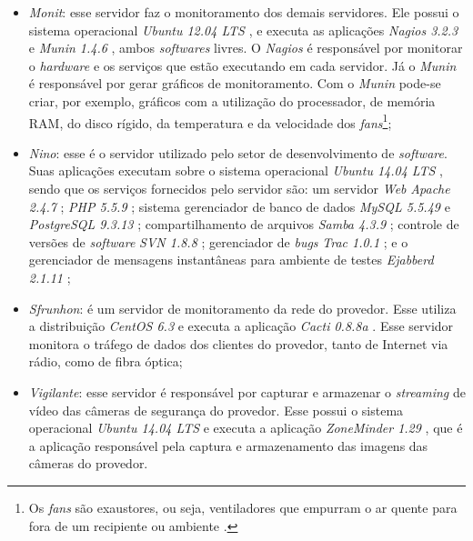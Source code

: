 \begin{itemize}
 \item \textit{Monit}: esse servidor faz o monitoramento dos demais servidores. Ele possui o sistema operacional \textit{Ubuntu 12.04 \ac{LTS}} 
 \cite{ubuntu}, e executa as aplicações \textit{Nagios 3.2.3} \cite{nagios} e \textit{Munin 1.4.6} \cite{munin}, ambos \textit{softwares} livres. 
 O \textit{Nagios} é responsável por monitorar o \textit{hardware} e os serviços que estão executando em cada servidor. Já o \textit{Munin} é 
 responsável por gerar gráficos de monitoramento. Com o \textit{Munin} pode-se criar, por exemplo, gráficos com a utilização do processador, 
 de memória \ac{RAM}, do disco rígido, da temperatura e da velocidade dos \textit{fans}\footnote[3]{Os \textit{fans} são exaustores, ou seja, 
 ventiladores que empurram o ar quente para fora de um recipiente ou ambiente \cite{ats2012}.};
 
 \item \textit{Nino}: esse é o servidor utilizado pelo setor de desenvolvimento de \textit{software}. Suas aplicações executam sobre o sistema 
 operacional \textit{Ubuntu 14.04 \ac{LTS}} \cite{ubuntu}, sendo que os serviços fornecidos pelo servidor são: um servidor \textit{Web} 
 \textit{Apache 2.4.7} \cite{apache}; \textit{\ac{PHP} 5.5.9} \cite{php}; sistema gerenciador de banco de dados \textit{MySQL 5.5.49} \cite{mysql} 
 e \textit{PostgreSQL 9.3.13} \cite{postgres}; compartilhamento de arquivos \textit{Samba 4.3.9} \cite{samba}; controle de versões de 
 \textit{software} \textit{\ac{SVN} 1.8.8} \cite{svn}; gerenciador de \textit{bugs} \textit{Trac 1.0.1} \cite{trac}; e o gerenciador de 
 mensagens instantâneas para ambiente de testes \textit{Ejabberd 2.1.11} \cite{ejabberd};
 
 \item \textit{Sfrunhon}: é um servidor de monitoramento da rede do provedor. Esse utiliza a distribuição \textit{CentOS 6.3} \cite{centos} e 
 executa a aplicação \textit{Cacti 0.8.8a} \cite{cacti}. Esse servidor monitora o tráfego de dados dos clientes do provedor, tanto de Internet 
 via rádio, como de fibra óptica;
 
 \item \textit{Vigilante}: esse servidor é responsável por capturar e armazenar o \textit{streaming} de vídeo das câmeras de segurança do provedor. 
 Esse possui o sistema operacional \textit{Ubuntu 14.04 \ac{LTS}} \cite{ubuntu} e executa a aplicação \textit{ZoneMinder 1.29} \cite{zoneminder}, 
 que é a aplicação responsável pela captura e armazenamento das imagens das câmeras do provedor.
\end{itemize}

